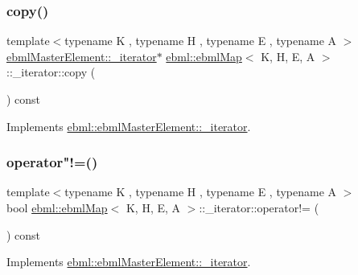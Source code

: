 \subsubsection{\texorpdfstring{copy()}{copy()}}
{\footnotesize\ttfamily template$<$typename K , typename H , typename E , typename A $>$ \\
\mbox{\hyperlink{classebml_1_1ebmlMasterElement_1_1__iterator}{ebml\+Master\+Element\+::\+\_\+iterator}}$\ast$ \mbox{\hyperlink{classebml_1_1ebmlMap}{ebml\+::ebml\+Map}}$<$ K, H, E, A $>$\+::\+\_\+iterator\+::copy (\begin{DoxyParamCaption}{ }\end{DoxyParamCaption}) const\hspace{0.3cm}{\ttfamily [virtual]}}



Implements \mbox{\hyperlink{classebml_1_1ebmlMasterElement_1_1__iterator_af9f522b6d6f34acb410add9579a35c13}{ebml\+::ebml\+Master\+Element\+::\+\_\+iterator}}.

\mbox{\label{classebml_1_1ebmlMap_1_1__iterator_a42189d25979dab96126d411ab83a3849}} 
\subsubsection{\texorpdfstring{operator"!=()}{operator!=()}}
{\footnotesize\ttfamily template$<$typename K , typename H , typename E , typename A $>$ \\
bool \mbox{\hyperlink{classebml_1_1ebmlMap}{ebml\+::ebml\+Map}}$<$ K, H, E, A $>$\+::\+\_\+iterator\+::operator!= (\begin{DoxyParamCaption}\item[{const \mbox{\hyperlink{classebml_1_1ebmlMasterElement_1_1__iterator}{ebml\+Master\+Element\+::\+\_\+iterator}} \&}]{ }\end{DoxyParamCaption}) const\hspace{0.3cm}{\ttfamily [virtual]}}



Implements \mbox{\hyperlink{classebml_1_1ebmlMasterElement_1_1__iterator_aef9e45972d70a546942f9de73af40dc2}{ebml\+::ebml\+Master\+Element\+::\+\_\+iterator}}.

\mbox{\label{classebml_1_1ebmlMap_1_1__iterator_aedbcdd2c78b42961a1f7478fec5080a4}} 
